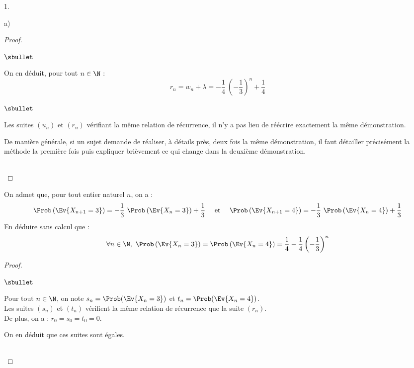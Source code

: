 \documentclass[11pt]{article}%
\begin{document}
\begin{noliste}{1.}
\begin{noliste}{a)}
\begin{proof}
\begin{noliste}{$\sbullet$}
      \item On en déduit, pour tout $n \in \N$ :
        \[
        r_n = w_n + \lambda = -\dfrac{1}{4} \ \left( - \dfrac{1}{3}
        \right)^n + \dfrac{1}{4}
        \]        
      \end{noliste}
    \begin{remark}%
      \begin{noliste}{$\sbullet$}
      \item Les suites $(u_n)$ et $(r_n)$ vérifiant la même relation
        de récurrence, il n'y a pas lieu de réécrire exactement la
        même démonstration.
      \item De manière générale, si un sujet demande de réaliser, à
        détails près, deux fois la même démonstration, il faut
        détailler précisément la méthode la première fois puis
        expliquer brièvement ce qui change dans la deuxième
        démonstration.
      \end{noliste}
    \end{remark}~\\[-1.4cm]
    \end{proof}

  \end{noliste}
  
\item On admet que, pour tout entier naturel $n$, on a :
  \[
  \Prob\left(\Ev{X_{n + 1} = 3}\right) = -\dfrac{1}{3} \ 
  \Prob\left(\Ev{X_{n} = 3}\right) + \dfrac{1}{3} \quad \hbox{ et }
  \quad \Prob\left(\Ev{X_{n + 1} = 4}\right) = -\dfrac{1}{3} \ 
  \Prob\left(\Ev{X_{n} = 4}\right) + \dfrac{1}{3}
  \]
  En déduire sans calcul que :
  \[
  \forall n \in \N, \ \Prob\left(\Ev{X_{n} = 3}\right) =
  \Prob\left(\Ev{X_{n} = 4}\right) =
  \dfrac{1}{4}-\dfrac{1}{4}\left(-\dfrac{1}{3}\right)^{n}
  \]

  \begin{proof}~%
    \begin{noliste}{$\sbullet$}
    \item Pour tout $n \in \N$, on note $s_n = \Prob(\Ev{X_n = 3})$ et
      $t_n = \Prob(\Ev{X_n = 4})$.\\
      Les suites $(s_n)$ et $(t_n)$ vérifient la même relation de
      récurrence que la suite $(r_n)$.\\
      De plus, on a : $r_0 = s_0 = t_0 = 0$.
    \item On en déduit que ces suites sont égales.
    \end{noliste}
    \conc{$\forall n \in \N$, $\Prob\left(\Ev{X_{n} = 2}\right) =
      \Prob\left(\Ev{X_{n} = 3}\right) = \Prob\left(\Ev{X_{n} =
          4}\right) = \dfrac{1}{4} -\dfrac{1}{4}
      \left(-\dfrac{1}{3}\right)^{n}$}~\\[-1cm]
  \end{proof}



\end{noliste}
\end{document}
